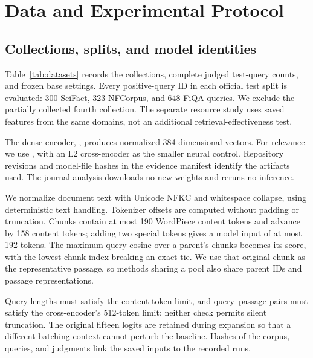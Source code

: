 \section{Data and Experimental Protocol}\label{sec:protocol}
\subsection{Collections, splits, and model identities}
Table~\ref{tab:datasets} records the collections, complete judged test-query counts, and frozen base settings. Every positive-query ID in each official test split is evaluated: 300 SciFact, 323 NFCorpus, and 648 FiQA queries. We exclude the partially collected fourth collection. The separate resource study uses saved features from the same domains, not an additional retrieval-effectiveness test.

\begin{table}[t]
\centering\small
\caption{Recorded datasets and configurations. Documents are parent documents. SciFact development is derived from official training; the other two use official development splits. The lexical weight is $\beta$ and the base redundancy weight is $\lambda$.}
\label{tab:datasets}
\end{table}

The dense encoder, , produces normalized 384-dimensional vectors. For relevance we use , with an L2 cross-encoder as the smaller neural control. Repository revisions and model-file hashes in the evidence manifest identify the artifacts used. The journal analysis downloads no new weights and reruns no inference.

We normalize document text with Unicode NFKC and whitespace collapse, using deterministic text handling. Tokenizer offsets are computed without padding or truncation. Chunks contain at most 190 WordPiece content tokens and advance by 158 content tokens; adding two special tokens gives a model input of at most 192 tokens. The maximum query cosine over a parent's chunks becomes its score, with the lowest chunk index breaking an exact tie. We use that original chunk as the representative passage, so methods sharing a pool also share parent IDs and passage representations.

Query lengths must satisfy the content-token limit, and query--passage pairs must satisfy the cross-encoder's 512-token limit; neither check permits silent truncation. The original fifteen logits are retained during expansion so that a different batching context cannot perturb the baseline. Hashes of the corpus, queries, and judgments link the saved inputs to the recorded runs.

